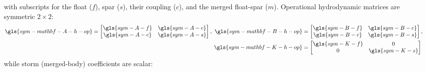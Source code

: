 \documentclass[a4paper,fleqn,colorlinks,unicode,lineno]{cas-dc} %
\providecommand{\DIFaddbegin}{} %
\providecommand{\DIFaddend}{} %
\providecommand{\DIFdelbegin}{} %
\providecommand{\DIFdelend}{} %
\providecommand{\DIFscaledelfig}{0.5}
\newlength{\DIFdelgraphicswidth} %
\newlength{\DIFdelgraphicsheight} %
\providecommand{\DIFaddincludegraphics}[2][]{{\color{blue}\fbox{\DIFOincludegraphics[#1]{#2}}}} %
\providecommand{\DIFdelincludegraphics}[2][]{%
\sbox{\DIFdelgraphicsbox}{\DIFOincludegraphics[#1]{#2}}%
\settoboxwidth{\DIFdelgraphicswidth}{\DIFdelgraphicsbox} %
\settoboxtotalheight{\DIFdelgraphicsheight}{\DIFdelgraphicsbox} %
\scalebox{\DIFscaledelfig}{%
\parbox[b]{\DIFdelgraphicswidth}{\usebox{\DIFdelgraphicsbox}\\[-\baselineskip] \rule{\DIFdelgraphicswidth}{0em}}\llap{\resizebox{\DIFdelgraphicswidth}{\DIFdelgraphicsheight}{%
\setlength{\unitlength}{\DIFdelgraphicswidth}%
\begin{picture}(1,1)%
\thicklines\linethickness{2pt} %
{\color[rgb]{1,0,0}\put(0,0){\framebox(1,1){}}}%
{\color[rgb]{1,0,0}\put(0,0){\line( 1,1){1}}}%
{\color[rgb]{1,0,0}\put(0,1){\line(1,-1){1}}}%
\end{picture}%
}\hspace*{3pt}}} %
} %
\DeclareRobustCommand{\DIFaddbegin}{\DIFOaddbegin \let\includegraphics\DIFaddincludegraphics} %
\DeclareRobustCommand{\DIFaddend}{\DIFOaddend \let\includegraphics\DIFOincludegraphics} %
\DeclareRobustCommand{\DIFdelbegin}{\DIFOdelbegin \let\includegraphics\DIFdelincludegraphics} %
\DeclareRobustCommand{\DIFdelend}{\DIFOaddend \let\includegraphics\DIFOincludegraphics} %
\begin{document}
with subscripts for the float ($f$), spar ($s$), their coupling ($c$), and the merged float-spar ($m$).
Operational hydrodynamic matrices are symmetric $2\times 2$:
\begin{equation}\label{eq:op-hydro-coeffs}
\DIFdelbegin %
\DIFdelend \DIFaddbegin \begin{aligned}
    \gls{sym-mathbf-A-h-op} = \begin{bmatrix}
        \gls{sym-A-f} & \gls{sym-A-c} \\ \gls{sym-A-c} & \gls{sym-A-s}
    \end{bmatrix},~
    \gls{sym-mathbf-B-h-op} &= \begin{bmatrix}
        \gls{sym-B-f} & \gls{sym-B-c} \\ \gls{sym-B-c} & \gls{sym-B-s}
    \end{bmatrix},
    \ifdefined\DISSERTATION
        ~
    \else
        \\
    \fi
    \gls{sym-mathbf-K-h-op} &= \begin{bmatrix}
        \gls{sym-K-f} & 0\\ 0 & \gls{sym-K-s}
    \end{bmatrix}
\end{aligned}\DIFaddend 
\end{equation}
while storm (merged-body) coefficients are scalar:
\end{document}
